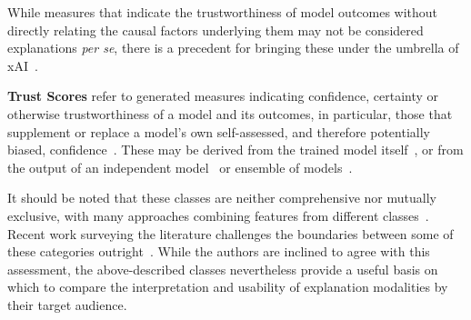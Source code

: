 While measures that indicate the trustworthiness of model outcomes without directly relating the causal factors underlying them may not be considered explanations \textit{per se}, there is a precedent for bringing these under the umbrella of xAI~\cite{poceviciute_survey_2020, lin2019explanations}.

\textbf{Trust Scores} refer to generated measures indicating confidence, certainty or otherwise trustworthiness of a model and its outcomes, in particular, those that supplement or replace a model's own self-assessed, and therefore potentially biased, confidence~\cite{jiang2018trust, wang2021ai}. These may be derived from the trained model itself~\cite{tagasovska2019single}, or from the output of an independent model~\cite{jiang2018trust} or ensemble of models~\cite{pearce2018high}.

It should be noted that these classes are neither comprehensive nor mutually exclusive, with many approaches combining features from different classes~\cite{kim2016examples,liu2019generative}. Recent work surveying the literature challenges the boundaries between some of these categories outright~\cite{zhang2021survey}. While the authors are inclined to agree with this assessment, the above-described classes nevertheless provide a useful basis on which to compare the interpretation and usability of explanation modalities by their target audience.




